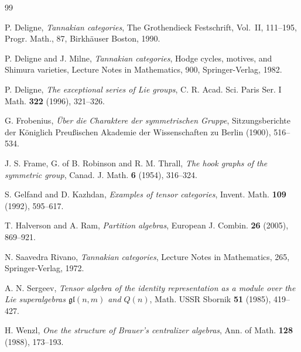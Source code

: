 \documentclass[11pt,a4paper]{article}
\theoremstyle{plain}
\theoremstyle{definition}
\begin{document}
\begin{thebibliography}{99}

P. Deligne, \textit{Tannakian categories}, The Grothendieck Festschrift, Vol.~II, 111--195, Progr. Math., 87, Birkh{\"a}user Boston, 1990.

P. Deligne and J. Milne, \textit{Tannakian categories}, Hodge cycles, motives, and Shimura varieties, Lecture Notes in Mathematics, 900, Springer-Verlag, 1982.

P. Deligne, \textit{The exceptional series of Lie groups}, C. R. Acad. Sci. Paris Ser. I Math. \textbf{322} (1996), 321--326.

G. Frobenius, \textit{\"Uber die Charaktere der symmetrischen Gruppe}, Sitzungsberichte der K\"oniglich Preu{\ss}ischen Akademie der Wissenschaften zu Berlin (1900), 516--534.

J. S. Frame, G. of B. Robinson and R. M. Thrall, \textit{The hook graphs of the symmetric group}, Canad. J. Math. \textbf{6} (1954), 316--324.

S. Gelfand and D. Kazhdan, \textit{Examples of tensor categories}, Invent. Math. \textbf{109} (1992), 595--617.

T. Halverson and A. Ram, \textit{Partition algebras}, European J. Combin. \textbf{26} (2005), 869--921.

N. Saavedra Rivano, \textit{Tannakian categories}, Lecture Notes in Mathematics, 265, Springer-Verlag, 1972.

A. N. Sergeev, \textit{Tensor algebra of the identity representation as a module over the Lie superalgebras $\mathfrak{gl}(n,m)$ and $Q(n)$}, Math. USSR Sbornik \textbf{51} (1985), 419--427.

H. Wenzl, \textit{One the structure of Brauer's centralizer algebras}, Ann. of Math. \textbf{128} (1988), 173--193.

\end{thebibliography}
\end{document}

